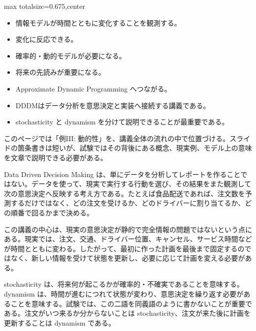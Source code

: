 \clearpage
{}
\begin{adjustbox}{max totalsize={\textwidth}{0.675\textheight},center}
\begin{minipage}{\textwidth}\scriptsize
\begin{minipage}[t]{0.485\textwidth}
\begin{itemize}
\item 情報モデルが時間とともに変化することを観測する。
\item 変化に反応できる。
\item 確率的・動的モデルが必要になる。
\item 将来の先読みが重要になる。
\item Approximate Dynamic Programming へつながる。
\end{itemize}
\begin{itemize}
\item DDDMはデータ分析を意思決定と実装へ接続する講義である。
\item stochasticity と dynamism を分けて説明できることが最重要である。
\end{itemize}
\end{minipage}\hfill
\begin{minipage}[t]{0.485\textwidth}
このページでは「例III: 動的性」を、講義全体の流れの中で位置づける。スライドの箇条書きは短いが、試験ではその背後にある概念、現実例、モデル上の意味を文章で説明できる必要がある。\par
Data Driven Decision Making は、単にデータを分析してレポートを作ることではない。データを使って、現実で実行する行動を選び、その結果をまた観測して次の意思決定へ反映する考え方である。たとえば食品配送であれば、注文数を予測するだけではなく、どの注文を受けるか、どのドライバーに割り当てるか、どの順番で回るかまで決める。\par
この講義の中心は、現実の意思決定が静的で完全情報の問題ではないという点にある。現実では、注文、交通、ドライバー位置、キャンセル、サービス時間などが時間とともに変わる。したがって、最初に作った計画を最後まで固定するのではなく、新しい情報を受けて状態を更新し、必要に応じて計画を変える必要がある。\par
stochasticity は、将来何が起こるかが確率的・不確実であることを意味する。dynamism は、時間が進むにつれて状態が変わり、意思決定を繰り返す必要があることを意味する。試験では、この二語を同義語のように書かないことが重要である。注文がいつ来るか分からないことは stochasticity、注文が来た後に計画を更新することは dynamism である。\par

\end{minipage}
\end{minipage}
\end{adjustbox}
